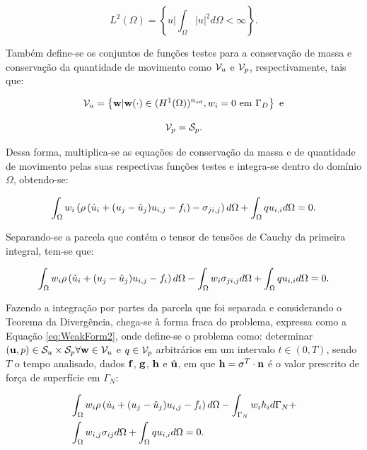 \documentclass[_ArquivoPrincipal.tex]{subfiles}
\begin{document}
\begin{equation}
    L^2(\Omega)=\left\{u|\int_\Omega{|u|^2d\Omega}<\infty\right\}\text{.}
\end{equation}

Também define-se os conjuntos de funções testes para a conservação de massa e conservação da quantidade de movimento como $\mathcal{V}_u$ e $\mathcal{V}_p$, respectivamente, tais que:

\begin{equation}
    \mathcal{V}_u=\left\{\mathbf{w}|\mathbf{w}(\cdot)\in(H^1(\Omega))^{n_{sd}},w_i=0\text{ em }\Gamma_D\right\}\text{ e}
\end{equation}

\begin{equation}
    \mathcal{V}_p=\mathcal{S}_p\text{.}
\end{equation}

Dessa forma, multiplica-se as equações de conservação da massa e de quantidade de movimento pelas suas respectivas funções testes e integra-se dentro do domínio $\Omega$, obtendo-se:

\begin{equation}
    \int_{\Omega}{w_i\left({\rho\left({\dot{u}_i+(u_j-\hat{u}_j)u_{i,j}-f_i}\right)-\sigma_{ji,j}}\right) d\Omega}+\int_{\Omega}{qu_{i,i} d\Omega}=0\text{.}
\end{equation}

Separando-se a parcela que contém o tensor de tensões de Cauchy da primeira integral, tem-se que:

\begin{equation}
    \int_{\Omega}{w_i\rho\left({\dot{u}_i+(u_j-\hat{u}_j)u_{i,j}-f_i}\right) d\Omega}-\int_{\Omega}{w_i\sigma_{ji,j} d\Omega}+\int_{\Omega}{qu_{i,i} d\Omega}=0\text{.}
    \label{eq:WeakForm1}
\end{equation}

Fazendo a integração por partes da parcela que foi separada e considerando o Teorema da Divergência, chega-se à forma fraca do problema, expressa como a Equação \ref{eq:WeakForm2}, onde define-se o problema como: determinar $(\mathbf{u},p)\in\mathcal{S}_u\times\mathcal{S}_p\forall\mathbf{w}\in\mathcal{V}_u$ e $q\in\mathcal{V}_p$ arbitrários em um intervalo $t\in(0,T)$, sendo $T$ o tempo analisado, dados $\mathbf{f}$, $\mathbf{g}$, $\mathbf{h}$ e $\hat{\mathbf{u}}$, em que $\mathbf{h}=\mathbf{\sigma}^T\cdot\mathbf{n}$ é o valor prescrito de força de superfície em $\Gamma_N$:

\begin{equation}
    \begin{split}
        &\int_{\Omega}{w_i\rho\left({\dot{u}_i+(u_j-\hat{u}_j)u_{i,j}-f_i}\right) d\Omega}-\int_{\Gamma_N}{w_ih_i d\Gamma_N}+\\
        &\int_{\Omega}{w_{i,j}\sigma_{ij} d\Omega}+\int_{\Omega}{qu_{i,i} d\Omega}=0\text{.}
    \end{split}
    \label{eq:WeakForm2}
\end{equation}
\end{document}
